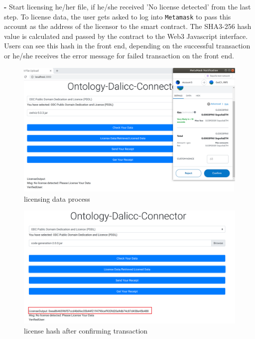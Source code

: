 \begin{itemize}
\begin{center}
\end{center}
    \textbf{- } Start licensing he/her file, if he/she received 'No license detected'  from the last step. To license data, the user gets asked to log into \texttt{Metamask} to pass this account as the address of the licensor to the smart contract. The SHA3-256 hash value is calculated and passed by the contract to the Web3 Javascript interface. Users can see this hash in the front end, depending on the successful transaction or he/she receives the error message for failed transaction on the front end.\\
    \begin{center}
	 \begin{figure}[htb!]
		\begin{minipage}{0.45\linewidth}
			\centering
			\includegraphics[width=1.95\textwidth]{images/chap03_license_data.png}
		\end{minipage}
		\caption[licensing data process]{licensing data process}
		
	\end{figure}
\end{center}
   \begin{center}
	\begin{figure}[htb!]
		
		\begin{minipage}{0.45\linewidth}
			\centering
			\includegraphics[width=1.95\textwidth]{images/chap03_license_hash.png}
		\end{minipage}
		\caption[license hash after confirming transaction]{license hash after confirming transaction}
		

\end{figure}
\end{center}
\end{itemize}
